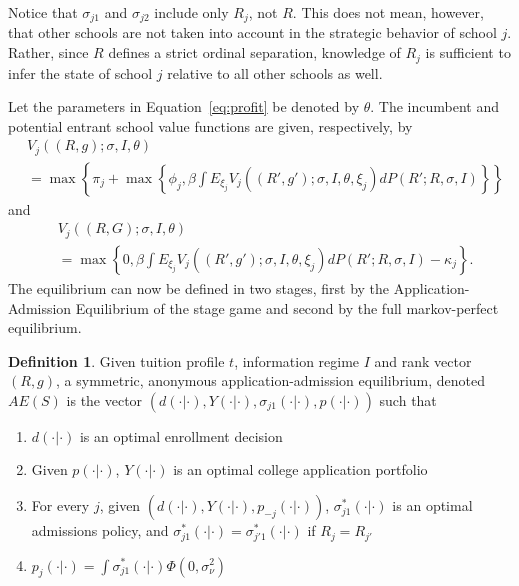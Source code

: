 \documentclass[12pt]{article}
\theoremstyle{definition}
\newtheorem{definition}{Definition}[section]
\begin{document}
Notice that $\sigma_{j1}$ and $\sigma_{j2}$ include only $R_j$, not $R$. This does not mean, however, that other schools are not taken into account in the strategic behavior of school $j$. Rather, since $R$ defines a strict ordinal separation, knowledge of $R_j$ is sufficient to infer the state of school $j$ relative to all other schools as well.

Let the parameters in Equation~\eqref{eq:profit} be denoted by $\theta$. The incumbent and potential entrant school value functions are given, respectively, by
\begin{equation}
  \begin{split}
    &V_{j}((R, g); \sigma, I, \theta) \\
    &= \max\left\{\pi_j + \max\left\{
      \phi_j,
      \beta\int
        E_{\xi_j}V_j((R', g');\sigma, I, \theta, \xi_j)
      dP(R'; R, \sigma, I)
    \right\}\right\}
  \end{split}
  \label{eq:Vinc}
\end{equation}
and
\begin{equation}
  \begin{split}
    &V_{j}((R, G); \sigma, I, \theta) \\
    &= \max\left\{
      0, \beta\int
        E_{\xi_j}V_j((R', g');\sigma, I, \theta, \xi_j)
      dP(R'; R, \sigma, I) - \kappa_j
    \right\}.
  \end{split}
  \label{eq:Vent}
\end{equation}
The equilibrium can now be defined in two stages, first by the Application-Admission Equilibrium of the stage game and second by the full markov-perfect equilibrium.
\begin{definition}
  Given tuition profile $t$, information regime $I$ and rank vector $(R, g)$, a symmetric, anonymous application-admission equilibrium, denoted $AE(S)$ is the vector $(d(\cdot|\cdot), Y(\cdot|\cdot), \sigma_{j1}(\cdot|\cdot), p(\cdot|\cdot))$ such that
  \begin{enumerate}
    \item $d(\cdot|\cdot)$ is an optimal enrollment decision
    \item Given $p(\cdot|\cdot)$, $Y(\cdot|\cdot)$ is an optimal college application portfolio
    \item For every $j$, given $(d(\cdot|\cdot), Y(\cdot|\cdot), p_{-j}(\cdot|\cdot))$, $\sigma^*_{j1}(\cdot|\cdot)$ is an optimal admissions policy, and $\sigma^*_{j1}(\cdot|\cdot) = \sigma^*_{j'1}(\cdot|\cdot)$ if $R_j = R_{j'}$
    \item $p_j(\cdot|\cdot) = \int\sigma^*_{j1}(\cdot|\cdot)\Phi(0, \sigma_\nu^2)$
  \end{enumerate}
\end{definition}
\end{document}

